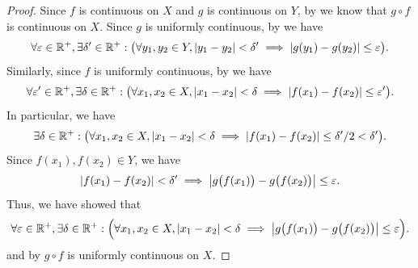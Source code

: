 \begin{proof}
  Since \(f\) is continuous on \(X\) and \(g\) is continuous on \(Y\), by  we know that \(g \circ f\) is continuous on \(X\).
  Since \(g\) is uniformly continuous, by  we have
  \[
    \forall \varepsilon \in \mathbb{R}^+, \exists \delta' \in \mathbb{R}^+ : \big(\forall y_1, y_2 \in Y, \left\lvert y_1 - y_2\right\rvert < \delta' \implies \left\lvert g(y_1) - g(y_2)\right\rvert \leq \varepsilon\big).
  \]
  Similarly, since \(f\) is uniformly continuous, by  we have
  \[
    \forall \varepsilon' \in \mathbb{R}^+, \exists \delta \in \mathbb{R}^+ : \big(\forall x_1, x_2 \in X, \left\lvert x_1 - x_2\right\rvert < \delta \implies \left\lvert f(x_1) - f(x_2)\right\rvert \leq \varepsilon'\big).
  \]
  In particular, we have
  \[
    \exists \delta \in \mathbb{R}^+ : \big(\forall x_1, x_2 \in X, \left\lvert x_1 - x_2\right\rvert < \delta \implies \left\lvert f(x_1) - f(x_2)\right\rvert \leq \delta' / 2 < \delta'\big).
  \]
  Since \(f(x_1), f(x_2) \in Y\), we have
  \[
    \left\lvert f(x_1) - f(x_2)\right\rvert < \delta' \implies \left\lvert g\big(f(x_1)\big) - g\big(f(x_2)\big)\right\rvert \leq \varepsilon.
  \]
  Thus, we have showed that
  \[
    \forall \varepsilon \in \mathbb{R}^+, \exists \delta \in \mathbb{R}^+ : \Big(\forall x_1, x_2 \in X, \left\lvert x_1 - x_2\right\rvert < \delta \implies \left\lvert g\big(f(x_1)\big) - g\big(f(x_2)\big)\right\rvert \leq \varepsilon\Big).
  \]
  and by  \(g \circ f\) is uniformly continuous on \(X\).
\end{proof}
